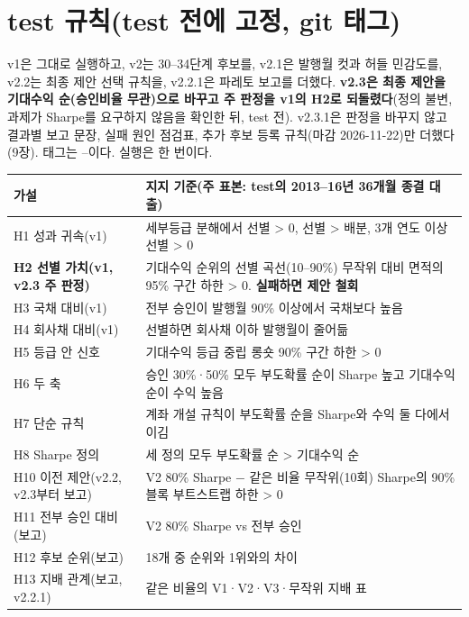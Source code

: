 \section{test 규칙(test 전에 고정, git 태그)}
v1은 그대로 실행하고, v2는 30--34단계 후보를, v2.1은 발행월 컷과 허들 민감도를, v2.2는 최종 제안 선택 규칙을, v2.2.1은 파레토 보고를 더했다. \textbf{v2.3은 최종 제안을 기대수익 순(승인비율 무관)으로 바꾸고 주 판정을 v1의 H2로 되돌렸다}(정의 불변, 과제가 Sharpe를 요구하지 않음을 확인한 뒤, test 전). v2.3.1은 판정을 바꾸지 않고 결과별 보고 문장, 실패 원인 점검표, 추가 후보 등록 규칙(마감 2026-11-22)만 더했다(9장). 태그는 --이다. 실행은  한 번이다.

\begin{table}[H]\centering\small
\begin{tabularx}{\linewidth}{@{}p{45mm}L@{}}\toprule
가설 & 지지 기준(주 표본: test의 2013--16년 36개월 종결 대출)\\\midrule
H1 성과 귀속(v1) & 세부등급 분해에서 선별 > 0, 선별 > 배분, 3개 연도 이상 선별 > 0\\
\textbf{H2 선별 가치(v1, v2.3 주 판정)} & 기대수익 순위의 선별 곡선(10--90\%) 무작위 대비 면적의 95\% 구간 하한 > 0. \textbf{실패하면 제안 철회}\\
H3 국채 대비(v1) & 전부 승인이 발행월 90\% 이상에서 국채보다 높음\\
H4 회사채 대비(v1) & 선별하면 회사채 이하 발행월이 줄어듦\\
H5 등급 안 신호 & 기대수익 등급 중립 롱숏 90\% 구간 하한 > 0\\
H6 두 축 & 승인 30\%·\allowbreak{}50\% 모두 부도확률 순이 Sharpe 높고 기대수익 순이 수익 높음\\
H7 단순 규칙 & 계좌 개설 규칙이 부도확률 순을 Sharpe와 수익 둘 다에서 이김\\
H8 Sharpe 정의 & 세 정의 모두 부도확률 순 > 기대수익 순\\
H10 이전 제안(v2.2, v2.3부터 보고) & V2 80\% Sharpe $-$ 같은 비율 무작위(10회) Sharpe의 90\% 블록 부트스트랩 하한 > 0\\
H11 전부 승인 대비(보고) & V2 80\% Sharpe vs 전부 승인\\
H12 후보 순위(보고) & 18개 중 순위와 1위와의 차이\\
H13 지배 관계(보고, v2.2.1) & 같은 비율의 V1·\allowbreak{}V2·\allowbreak{}V3·\allowbreak{}무작위 지배 표\\\bottomrule
\end{tabularx}
\end{table}

